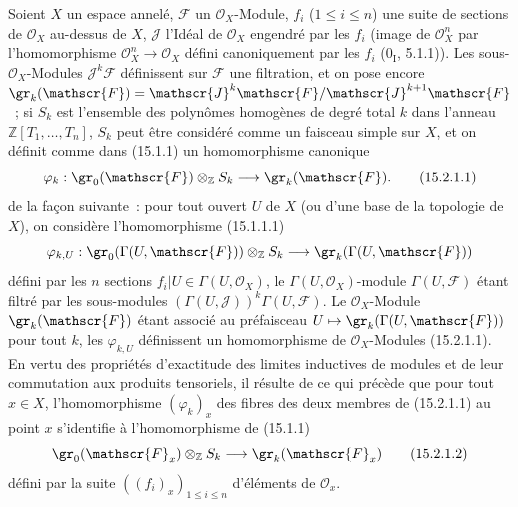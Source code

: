 \begin{env}[15.2.1]
\label{0.15.2.1-fr}
Soient $X$ un espace annelé, $\mathscr{F}$ un $\mathcal{O}_X$-Module,
$f_i$ ($1\leq i\leq n$) une suite de sections de $\mathcal{O}_X$ au-dessus
de $X$, $\mathscr{J}$ l'Idéal de $\mathcal{O}_X$ engendré par les $f_i$
(image de $\mathcal{O}_X^n$ par l'homomorphisme
$\mathcal{O}_X^n\to\mathcal{O}_X$ défini canoniquement par les $f_i$
($0_{\mathrm I}$, 5.1.1)). Les sous-$\mathcal{O}_X$-Modules
$\mathscr{J}^k\mathscr{F}$ définissent sur $\mathscr{F}$ une filtration, et
on pose encore
$\gr_k(\mathscr{F})=\mathscr{J}^k\mathscr{F}/\mathscr{J}^{k+1}\mathscr{F}$~;
si $S_k$ est l'ensemble des polynômes homogènes de degré total $k$ dans
l'anneau $\mathbb{Z}[T_1,\ldots,T_n]$, $S_k$ peut être considéré comme un
faisceau simple sur $X$, et on définit comme dans (15.1.1) un homomorphisme
canonique
\[
\label{0.15.2.1.1-fr}
  \varphi_k:\gr_0(\mathscr{F})\otimes_{\mathbb Z}S_k
  \longrightarrow\gr_k(\mathscr{F}).
\tag{15.2.1.1}
\]
de la façon suivante~: pour tout ouvert $U$ de $X$ (ou d'une base de la
topologie de $X$), on considère l'homomorphisme (15.1.1.1)
\[
  \varphi_{k,U}:\gr_0(\Gamma(U,\mathscr{F}))\otimes_{\mathbb Z}S_k
  \longrightarrow\gr_k(\Gamma(U,\mathscr{F}))
\]
défini par les $n$ sections $f_i|U\in\Gamma(U,\mathcal{O}_X)$, le
$\Gamma(U,\mathcal{O}_X)$-module $\Gamma(U,\mathscr{F})$ étant filtré par les
sous-modules $(\Gamma(U,\mathscr{J}))^k\Gamma(U,\mathscr{F})$. Le
$\mathcal{O}_X$-Module $\gr_k(\mathscr{F})$ étant associé au préfaisceau
$U\mapsto\gr_k(\Gamma(U,\mathscr{F}))$ pour tout $k$, les $\varphi_{k,U}$
définissent un homomorphisme de $\mathcal{O}_X$-Modules (15.2.1.1). En vertu
des propriétés d'exactitude des limites inductives de modules et de leur
commutation aux produits tensoriels, il résulte de ce qui précède que pour
tout $x\in X$, l'homomorphisme $(\varphi_k)_x$ des fibres des deux membres de
(15.2.1.1) au point $x$ s'identifie à l'homomorphisme de (15.1.1)
\[
\label{0.15.2.1.2-fr}
  \gr_0(\mathscr{F}_x)\otimes_{\mathbb Z}S_k
  \longrightarrow\gr_k(\mathscr{F}_x)
\tag{15.2.1.2}
\]
défini par la suite $((f_i)_x)_{1\leq i\leq n}$ d'éléments de
$\mathcal{O}_x$.
\end{env}

